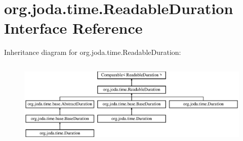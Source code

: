 \hypertarget{interfaceorg_1_1joda_1_1time_1_1_readable_duration}{\section{org.\-joda.\-time.\-Readable\-Duration Interface Reference}
\label{interfaceorg_1_1joda_1_1time_1_1_readable_duration}
}
Inheritance diagram for org.\-joda.\-time.\-Readable\-Duration\-:\begin{figure}[H]
\begin{center}
\leavevmode
\includegraphics[height=4.185351cm]{interfaceorg_1_1joda_1_1time_1_1_readable_duration}
\end{center}
\end{figure}
